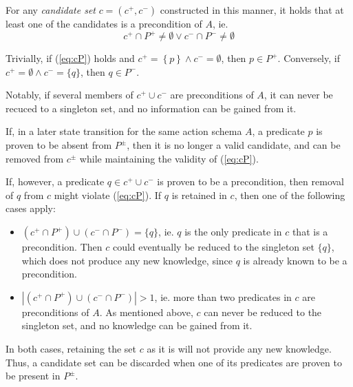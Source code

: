 \documentclass[../Master.tex]{subfiles}
\begin{document}
For any \emph{candidate set} $c=\left(c^{+},c^{-}\right)$ constructed in this
manner, it holds that at least one of the candidates is a precondition of $A$,
ie. \begin{equation} c^{+}\cap P^{+}\neq\emptyset\lor c^{-}\cap
P^{-}\neq\emptyset\label{eq:cP} \end{equation}

\begin{cor} \label{candThe}Trivially, if (\ref{eq:cP}) holds and $c^{+}=\left\{
p\right\} \land c^{-}=\emptyset$, then $p\in P^{+}$. Conversely, if
$c^{+}=\emptyset\land c^{-}=\{q\}$, then $q\in P^{-}$. \end{cor} Notably, if
several members of $c^{+}\cup c^{-}$ are preconditions of $A$, it can never be
recuced to a singleton set, and no information can be gained from it.

If, in a later state transition for the same action schema $A$, a predicate $p$
is proven to be absent from $P^{\pm}$, then it is no longer a valid candidate,
and can be removed from $c^{\pm}$ while maintaining the validity of
(\ref{eq:cP}).

If, however, a predicate $q\in c^{+}\cup c^{-}$ is proven to be a precondition,
then removal of $q$ from $c$ might violate (\ref{eq:cP}). If $q$ is retained in
$c$, then one of the following cases apply: \begin{itemize} \item
$\left(c^{+}\cap P^{+}\right)\cup\left(c^{-}\cap P^{-}\right)=\{q\}$, ie. $q$ is
the only predicate in $c$ that is a precondition. Then $c$ could eventually be
reduced to the singleton set $\{q\}$, which does not produce any new knowledge,
since $q$ is already known to be a precondition. \item $\left|\left(c^{+}\cap
P^{+}\right)\cup\left(c^{-}\cap P^{-}\right)\right|>1$, ie. more than two
predicates in $c$ are preconditions of $A$. As mentioned above, $c$ can never be
reduced to the singleton set, and no knowledge can be gained from it.
\end{itemize} In both cases, retaining the set $c$ as it is will not provide any
new knowledge. Thus, a candidate set can be discarded when one of its predicates
are proven to be present in $P^{\pm}$.
\end{document}
